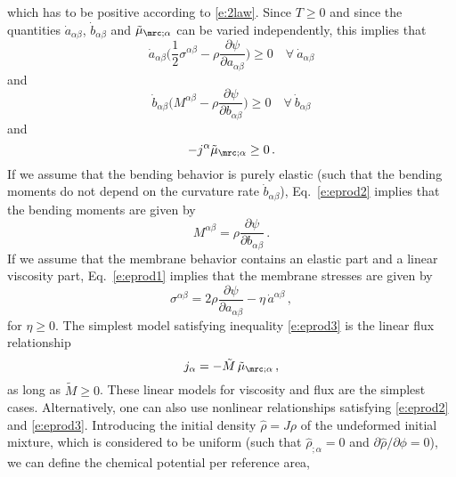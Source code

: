 \documentclass[11pt]{article}
\begin{document}
%
which has to be positive according to \eqref{e:2law}.
Since $T \geq 0$ and since the quantities $\dot{a}_{\alpha \beta}$, $\dot{b}_{\alpha \beta}$ and 
$\tilde\mu_{\mrc; \alpha}$ 
can be varied independently, this implies that
\begin{equation} \label{e:eprod1}
\dot{a}_{\alpha \beta}\bigg(\dfrac{1}{2} \sigma^{\alpha \beta} - \rho \dfrac{\partial \psi}{\partial a_{\alpha \beta}}\bigg) \geq 0 
\quad \forall~\dot{a}_{\alpha \beta}
\end{equation}
%
and 
\begin{equation}\label{e:eprod2}
\dot{b}_{\alpha \beta} \bigg( M^{\alpha \beta} - \rho \dfrac{\partial \psi}{\partial b_{\alpha \beta}} \bigg) \geq 0 
\quad \forall~\dot{b}_{\alpha \beta}
\end{equation}
%
and
\begin{equation}\label{e:eprod3}
- j^\alpha \tilde\mu_{\mrc;\alpha} \geq 0\,.
\end{equation}
%
If we assume that the bending behavior is purely elastic (such that the bending moments do not depend on the curvature rate $\dot b_{\alpha \beta}$), Eq.~\eqref{e:eprod2} implies that the bending moments are given by
\begin{equation} \label{e:Mphi}
M^{\alpha \beta} =   \rho \dfrac{\partial \psi}{\partial b_{\alpha \beta} }\,.
\end{equation}
%
If we assume that the membrane behavior contains an elastic part and a linear viscosity part, Eq.~\eqref{e:eprod1} implies that the membrane stresses are given by
\begin{equation} \label{e:sigphi}
\sigma^{\alpha \beta} = 2 \rho \dfrac{\partial \psi}{\partial a_{\alpha \beta}} - \eta\,\dot{a}^{\alpha \beta}\,,
\end{equation}
%
for $\eta\geq0$.
The simplest model satisfying inequality \eqref{e:eprod3} is the linear flux relationship 
\begin{equation} \label{e:jphi}
j_\alpha = - \tilde M \, \tilde\mu_{\mrc;\alpha}\,, 
\end{equation}
as long as $\tilde M\geq0$. These linear models for viscosity and flux are the simplest cases. Alternatively, one can also use nonlinear relationships satisfying \eqref{e:eprod2} and \eqref{e:eprod3}.
Introducing the initial density $\hat\rho = J\rho$ of the undeformed initial mixture, which is considered to be uniform (such that $\hat\rho_{;\alpha}=0$ and $\partial\hat\rho/\partial\phi=0$), we can define the chemical potential per reference area,
\end{document}
